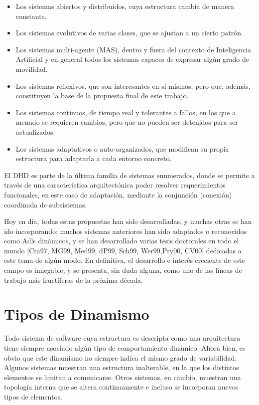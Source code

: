 \begin{itemize}
 \item Los sistemas abiertos y distribuidos, cuya estructura cambia de manera
constante.

\item Los sistemas evolutivos de varias clases, que se ajustan a un cierto
patrón.

\item Los sistemas multi-agente (MAS), dentro y fuera del contexto
de Inteligencia Artificial y en general todos los sistemas capaces de expresar 
algún grado de movilidad.

\item Los sistemas reflexivos, que son interesantes en sí
mismos, pero que, además, constituyen la base de la propuesta final de este
trabajo.

\item Los sistemas continuos, de tiempo real y tolerantes a fallos, en los que
a menudo se requieren cambios, pero que no pueden ser detenidos para ser
actualizados.

\item Los sistemas adaptativos o auto-organizados, que modifican su propia
estructura para adaptarla a cada entorno concreto.

\end{itemize}


El DHD es parte de la última familia de sistemas enumerados, donde se permite
a través de una característica arquitectónica poder resolver requerimientos
funcionales, en este caso de adaptación, mediante la conjunción (conexión)
coordinada de subsistemas.


Hoy en día, todas estas propuestas han sido desarrolladas, y muchas otras se
han ido incorporando; muchos sistemas anteriores han sido adaptados o
reconocidos como Adls dinámicos, y se han desarrollado varias tesis doctorales
en todo el mundo [Cra97, MG99, Med99, dP99, Sch99, Wer99,Pry00, CV00] dedicadas
a este tema de algún modo. En definitiva, el desarrollo e interés creciente
de este campo es innegable, y se presenta, sin duda alguna, como uno de las
líneas de trabajo más fructíferas de la próxima década.


\section{Tipos de Dinamismo}

Todo sistema de software cuya estructura es descripta como una arquitectura tiene
siempre asociado algún tipo de comportamiento dinámico. Ahora bien, es
obvio que este dinamismo no siempre indica el mismo grado de variabilidad.
Algunos sistemas muestran una estructura inalterable, en la que los distintos
elementos se limitan a comunicarse. Otros sistemas, en cambio, muestran una topología interna que se altera continuamente e incluso se incorporan nuevos tipos de elementos.

